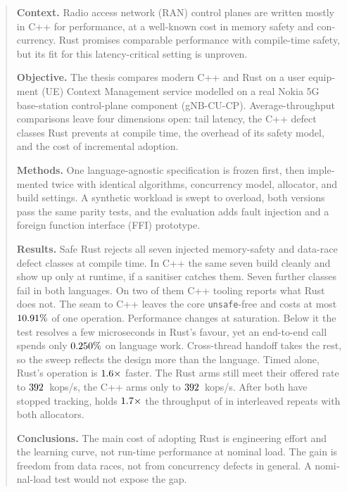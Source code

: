 \documentclass[english,oneside,a4paper,censored,csm,software-track-2020]{HYthesisML}
\begin{document}
{\singlespacing
\begin{otherlanguage}{english}
\begin{abstract}
\noindent\textbf{Context.}
Radio access network (RAN) control planes are written mostly in C++ for performance, at a
well-known cost in memory safety and concurrency. Rust promises comparable performance with
compile-time safety, but its fit for this latency-critical setting is unproven.

\noindent\textbf{Objective.}
The thesis compares modern C++ and Rust on a user equipment (UE) Context Management service
modelled on a real Nokia 5G base-station control-plane component (gNB-CU-CP).
Average-throughput comparisons leave four dimensions open: tail latency, the C++ defect classes Rust prevents at compile time, the overhead of
its safety model, and the cost of incremental adoption.

\noindent\textbf{Methods.}
One language-agnostic specification is frozen first, then implemented twice with identical
algorithms, concurrency model, allocator, and build settings. A synthetic workload is swept to
overload, both versions pass the same parity tests, and the evaluation adds fault injection and a
foreign function interface (FFI) prototype.

\noindent\textbf{Results.}
Safe Rust rejects all seven injected memory-safety and data-race defect classes at compile
time. In C++ the same seven build cleanly and show up only at runtime, if a sanitiser catches
them. Seven further classes fail in both languages. On two of them C++ tooling reports what
Rust does not. The seam to C++ leaves the core \texttt{unsafe}-free and costs at most
$\FfiOpBoundPct\%$ of one operation. Performance changes at saturation. Below it the test resolves a few microseconds in Rust's favour, yet an end-to-end call spends only $\BudgetCoreShareMax\%$ on language
work. Cross-thread handoff takes the rest, so the sweep reflects the design more than the
language. Timed alone, Rust's operation is $\BudgetCoreRatio\times$ faster. The Rust arms still meet their offered rate to $\TrackingLoadRust$~kops/s, the C++ arms only to $\TrackingLoadCpp$~kops/s. After both have stopped tracking, \OverloadSustainedFaster{} holds
$\OverloadThrRatio\times$ the throughput of \OverloadSustainedSlower{} in \OverloadThrAgree{}
interleaved repeats with both allocators. 

\noindent\textbf{Conclusions.}
The main cost of adopting Rust is engineering effort and the learning curve, not run-time
performance at nominal load. The gain is freedom from data races, not from concurrency
defects in general. A nominal-load test would not expose the gap.
\end{abstract}
\end{otherlanguage}
}
\end{document}
